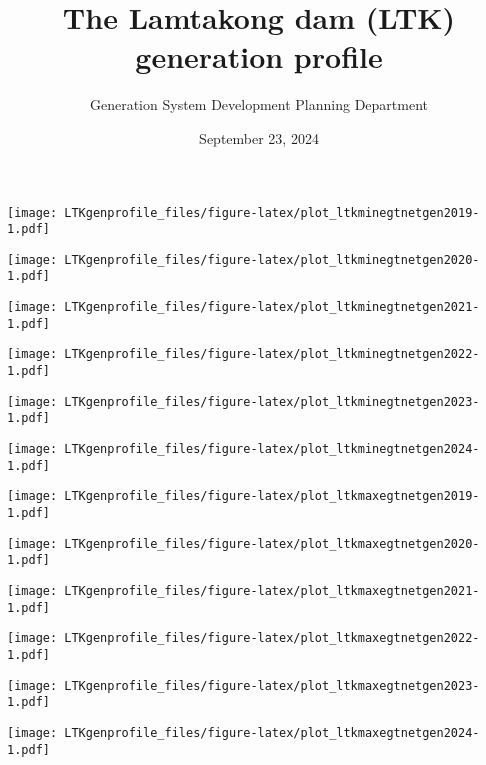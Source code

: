 \documentclass[
]{article}
\title{The Lamtakong dam (LTK) generation profile}
\author{Generation System Development Planning Department}
\date{September 23, 2024}
\begin{document}
\maketitle

\texttt{[image: LTKgenprofile\_files/figure-latex/plot\_ltkminegtnetgen2019-1.pdf]}

\texttt{[image: LTKgenprofile\_files/figure-latex/plot\_ltkminegtnetgen2020-1.pdf]}

\texttt{[image: LTKgenprofile\_files/figure-latex/plot\_ltkminegtnetgen2021-1.pdf]}

\texttt{[image: LTKgenprofile\_files/figure-latex/plot\_ltkminegtnetgen2022-1.pdf]}

\texttt{[image: LTKgenprofile\_files/figure-latex/plot\_ltkminegtnetgen2023-1.pdf]}

\texttt{[image: LTKgenprofile\_files/figure-latex/plot\_ltkminegtnetgen2024-1.pdf]}

\texttt{[image: LTKgenprofile\_files/figure-latex/plot\_ltkmaxegtnetgen2019-1.pdf]}

\texttt{[image: LTKgenprofile\_files/figure-latex/plot\_ltkmaxegtnetgen2020-1.pdf]}

\texttt{[image: LTKgenprofile\_files/figure-latex/plot\_ltkmaxegtnetgen2021-1.pdf]}

\texttt{[image: LTKgenprofile\_files/figure-latex/plot\_ltkmaxegtnetgen2022-1.pdf]}

\texttt{[image: LTKgenprofile\_files/figure-latex/plot\_ltkmaxegtnetgen2023-1.pdf]}

\texttt{[image: LTKgenprofile\_files/figure-latex/plot\_ltkmaxegtnetgen2024-1.pdf]}
\end{document}
